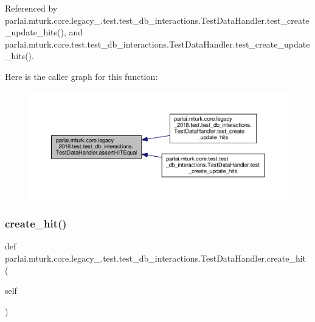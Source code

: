 Referenced by parlai.\+mturk.\+core.\+legacy\+\_.\+test.\+test\+\_\+db\+\_\+interactions.\+Test\+Data\+Handler.\+test\+\_\+create\+\_\+update\+\_\+hits(), and parlai.\+mturk.\+core.\+test.\+test\+\_\+db\+\_\+interactions.\+Test\+Data\+Handler.\+test\+\_\+create\+\_\+update\+\_\+hits().

Here is the caller graph for this function\+:
\nopagebreak
\begin{figure}[H]
\begin{center}
\leavevmode
\includegraphics[width=350pt]{classparlai_1_1mturk_1_1core_1_1legacy__2018_1_1test_1_1test__db__interactions_1_1TestDataHandler_a437b199b892112761fd6171663658c06_icgraph}
\end{center}
\end{figure}
\mbox{\label{classparlai_1_1mturk_1_1core_1_1legacy__2018_1_1test_1_1test__db__interactions_1_1TestDataHandler_a4b6e2a2603dfb8ae8dfb74c84bb57c1b}} 
\subsubsection{\texorpdfstring{create\+\_\+hit()}{create\_hit()}}
{\footnotesize\ttfamily def parlai.\+mturk.\+core.\+legacy\+\_.\+test.\+test\+\_\+db\+\_\+interactions.\+Test\+Data\+Handler.\+create\+\_\+hit (\begin{DoxyParamCaption}\item[{}]{self }\end{DoxyParamCaption})}



